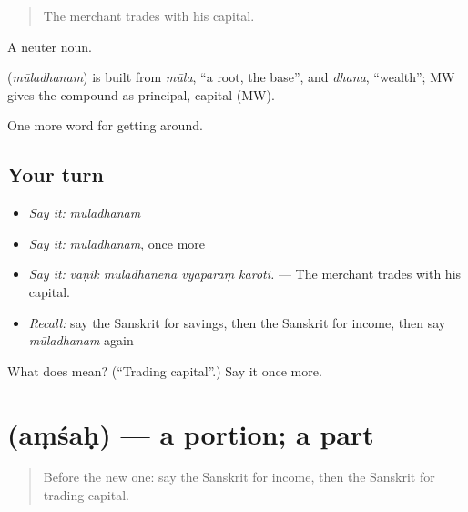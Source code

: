 \begin{quote}
The merchant trades with his capital.
\end{quote}

A neuter noun.

\begin{cousinweb}
\textbf{} (\emph{mūladhanam}) is built from \emph{mūla}, \textquotedblleft{}a root, the base\textquotedblright{}, and \emph{dhana}, \textquotedblleft{}wealth\textquotedblright{}; MW gives the compound as principal, capital (MW).
\end{cousinweb}

\begin{grammarlens}[title={What you've built}]
One more word for getting around.
\end{grammarlens}

\subsection*{Your turn}
\begin{itemize}
\raggedright
  \item \emph{Say it:} \emph{mūladhanam}
  \item \emph{Say it:} \emph{mūladhanam}, once more
  \item \emph{Say it:} \emph{vaṇik mūladhanena vyāpāraṃ karoti.} — The merchant trades with his capital.
  \item \emph{Recall:} say the Sanskrit for savings, then the Sanskrit for income, then say \emph{mūladhanam} again
\end{itemize}

\begin{tcolorbox}[breakable,colback=teal!4,colframe=teal!35!black,title={Before you move on}]
What does  mean? (\textquotedblleft{}Trading capital\textquotedblright{}.) Say it once more.
\end{tcolorbox}
\section[\texorpdfstring{\sk{अंशः} (aṃśaḥ)}{अंशः (aṃśaḥ)}]{ (aṃśaḥ) — a portion; a part}

\label{lesson:SA-C433-amsah}



\begin{quote}
Before the new one: say the Sanskrit for income, then the Sanskrit for trading capital.
\end{quote}

